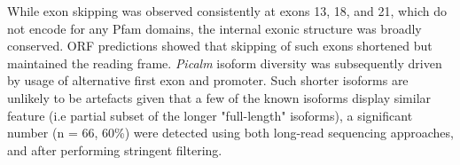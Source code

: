 While exon skipping was observed consistently at exons 13, 18, and 21, which do not encode for any Pfam domains, the internal exonic structure was broadly conserved. ORF predictions showed that skipping of such exons shortened but maintained the reading frame. \textit{Picalm} isoform diversity was subsequently driven by usage of alternative first exon and promoter. Such shorter isoforms are unlikely to be artefacts given that a few of the known isoforms display similar feature (i.e partial subset of the longer "full-length" isoforms), a significant number (n = 66, 60\%) were detected using both long-read sequencing approaches, and after performing stringent filtering. 
	

